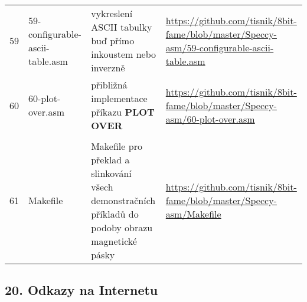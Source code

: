 \documentclass{article}
\begin{document}
\begin{longtable}[]{@{}llll@{}}
59 & 59-configurable-ascii-table.asm & vykreslení ASCII tabulky buď
přímo inkoustem nebo inverzně &
\url{https://github.com/tisnik/8bit-fame/blob/master/Speccy-asm/59-configurable-ascii-table.asm} \\
60 & 60-plot-over.asm & přibližná implementace příkazu \textbf{PLOT
OVER} &
\url{https://github.com/tisnik/8bit-fame/blob/master/Speccy-asm/60-plot-over.asm} \\
& & & \\
61 & Makefile & Makefile pro překlad a slinkování všech demonstračních
příkladů do podoby obrazu magnetické pásky &
\url{https://github.com/tisnik/8bit-fame/blob/master/Speccy-asm/Makefile} \\
\bottomrule
\end{longtable}

\hypertarget{k20}{%
\subsection{20. Odkazy na Internetu}\label{k20}}
\end{document}
